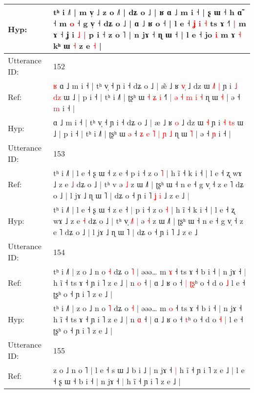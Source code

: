 \documentclass[10pt]{article}
\DeclareRobustCommand{\hl}[1]{{\textcolor{red}{#1}}}
\begin{document}
\begin{longtable}{ll}
 \\
Hyp: & tʰ i ˩˥ | m v̩ ˩ z o ˩˥ | dʑ o ˩ | ʁ ɑ ˩ m i ˧ | ʂ ɯ ˧ h ɑ̃ ˧\hl{}\hl{} m \hl{o} ˧ g v̩ ˧ dʑ o ˩ | ɑ ˩ ʁ o ˧ | l e ˧ \hl{}\hl{ʝ} \hl{i} \hl{˧} ts ɤ ˧\hl{˥}\hl{ }\hl{|} m ɤ ˧ ʝ i\hl{ }\hl{˩} \hl{|} p i ˧ z o ˥ | n jɤ ˧ ɳ ɯ ˧ | l e ˧ jo \hl{i} m ɤ \hl{˧} kʰ ɯ \hl{˧} z e \hl{˧} |
 \\
\midrule
Utterance ID: & 152 \\
Ref: & \hl{ʁ}\hl{ }ɑ ˩ m i ˧ | tʰ v̩ ˧ ɲ i ˧ dʑ o ˩ | æ\hl{̃} ˩ ʁ \hl{v}\hl{̩} ˩ dz ɯ\hl{ }\hl{˩}\hl{˥} \hl{|} ɲ i \hl{˩} \hl{d}\hl{z} ɯ ˩ | p i ˧ | tʰ i ˩˥ | ʈʂʰ ɯ\hl{ }\hl{˧}\hl{ }\hl{ʑ} \hl{i} ˧\hl{˥} \hl{|} \hl{ə} \hl{˧} \hl{m} \hl{i} \hl{˧} ɳ ɯ \hl{˧} | ə ˧ \hl{m} i ˧ |
 \\
Hyp: & \hl{}\hl{}ɑ ˩ m i ˧ | tʰ v̩ ˧ ɲ i ˧ dʑ o ˩ | æ\hl{} ˩ ʁ \hl{}\hl{o} ˩ dz ɯ\hl{}\hl{}\hl{} \hl{˧} ɲ i \hl{˧} \hl{t}\hl{s} ɯ ˩ | p i ˧ | tʰ i ˩˥ | ʈʂʰ ɯ\hl{}\hl{}\hl{}\hl{} \hl{ə} ˧\hl{} \hl{ʑ} \hl{e} \hl{˥} \hl{|} \hl{ɲ} \hl{˩} ɳ ɯ \hl{˥} | ə ˧ \hl{ɲ} i ˧ |
 \\
\midrule
Utterance ID: & 153 \\
Ref: & tʰ i ˩˥ | l e ˧ ʂ ɯ ˧ z e ˧\hl{}\hl{} p i ˧ z o \hl{˥} | h ĩ ˧ k i ˧ | l e ˧ ʐ wɤ ˩ z e \hl{˩} dʑ o ˩ | tʰ v\hl{}\hl{}\hl{}\hl{}\hl{}\hl{} ə \hl{˩} z ɯ ˩˥ | ʈʂʰ ɯ ˧ n e ˧ g v̩ ˧ z e ˥ dʑ o ˩ | l jɤ ˩ ɳ ɯ ˥ | dʑ o ˧ ɲ i ˥\hl{ }\hl{ʝ}\hl{ }\hl{i} ˩ z e ˩\hl{ }\hl{|}
 \\
Hyp: & tʰ i ˩˥ | l e ˧ ʂ ɯ ˧ z e ˧\hl{ }\hl{|} p i ˧ z o \hl{˧} | h ĩ ˧ k i ˧ | l e ˧ ʐ wɤ ˩ z e \hl{˧} dʑ o ˩ | tʰ v\hl{̩}\hl{ }\hl{˩}\hl{˥}\hl{ }\hl{|} ə \hl{˧} z ɯ ˩˥ | ʈʂʰ ɯ ˧ n e ˧ g v̩ ˧ z e ˥ dʑ o ˩ | l jɤ ˩ ɳ ɯ ˥ | dʑ o ˧ ɲ i ˥\hl{}\hl{}\hl{}\hl{} ˩ z e ˩\hl{}\hl{}
 \\
\midrule
Utterance ID: & 154 \\
Ref: & tʰ i ˩˥ | z o ˩ n o \hl{˧} dʑ o \hl{˥} | əəə… m \hl{ɤ} ˧ ts ɤ ˧ b i ˧ | n jɤ ˧\hl{ }\hl{|} h ĩ ˧ ts ɤ ˧ ɲ i ˥ z e ˩ | n \hl{o} ˧ | ɑ ˩ ʁ o ˧\hl{ }\hl{|} \hl{ʈ}\hl{ʂ}ʰ o ˧ d o\hl{}\hl{} \hl{˩} l e ˧ ʈʂʰ o ˧ ɲ i ˥ z e ˩ |
 \\
Hyp: & tʰ i ˩˥ | z o ˩ n o \hl{˥} dʑ o \hl{˧} | əəə… m \hl{o} ˧ ts ɤ ˧ b i ˧ | n jɤ ˧\hl{}\hl{} h ĩ ˧ ts ɤ ˧ ɲ i ˥ z e ˩ | n \hl{ɑ} ˧ | ɑ ˩ ʁ o ˧\hl{}\hl{} \hl{}\hl{t}ʰ o ˧ d o\hl{ }\hl{˧} \hl{|} l e ˧ ʈʂʰ o ˧ ɲ i ˥ z e ˩ |
 \\
\midrule
Utterance ID: & 155 \\
Ref: & z o ˩ n o ˥ | l e ˧ s ɯ ˩ b i ˩ | n jɤ ˧\hl{ }\hl{|} h ĩ ˧ ɲ i ˥ z e ˩ | l e ˧ ʂ ɯ ˧ b i ˧ | n jɤ ˧\hl{ }\hl{|} h ĩ ˧ ɲ i ˥ z e ˩ |

\end{longtable}
\end{document}

